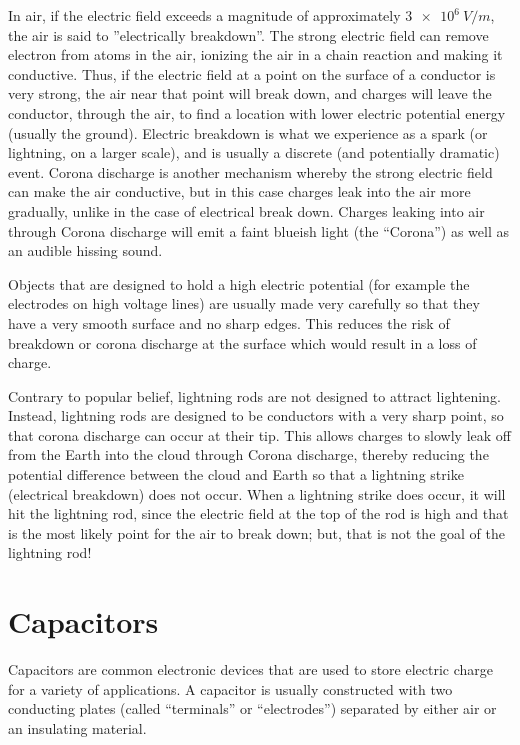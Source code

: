 In air, if the electric field exceeds a magnitude of approximately $\SI{3e6}{V/m}$, the air is said to ''electrically breakdown''. The strong electric field can remove electron from atoms in the air, ionizing the air in a chain reaction and making it conductive. Thus, if the electric field at a point on the surface of a conductor is very strong, the air near that point will break down, and charges will leave the conductor, through the air, to find a location with lower electric potential energy (usually the ground). Electric breakdown is what we experience as a spark (or lightning, on a larger scale), and is usually a discrete (and potentially dramatic) event. Corona discharge is another mechanism whereby the strong electric field can make the air conductive, but in this case charges leak into the air more gradually, unlike in the case of electrical break down. Charges leaking into air through Corona discharge will emit a faint blueish light (the ``Corona'') as well as an audible hissing sound.

Objects that are designed to hold a high electric potential (for example the electrodes on high voltage lines) are usually made very carefully so that they have a very smooth surface and no sharp edges. This reduces the risk of breakdown or corona discharge at the surface which would result in a loss of charge.

Contrary to popular belief, lightning rods are not designed to attract lightening. Instead, lightning rods are designed to be conductors with a very sharp point, so that corona discharge can occur at their tip. This allows charges to slowly leak off from the Earth into the cloud through Corona discharge, thereby reducing the potential difference between the cloud and Earth so that a lightning strike (electrical breakdown) does not occur. When a lightning strike does occur, it will hit the lightning rod, since the electric field at the top of the rod is high and that is the most likely point for the air to break down; but, that is not the goal of the lightning rod!
\newpage
\section{Capacitors}
\label{sec:potential:capacitors}
Capacitors are common electronic devices that are used to store electric charge for a variety of applications. A capacitor is usually constructed with two conducting plates (called ``terminals'' or ``electrodes'') separated by either air or an insulating material.

